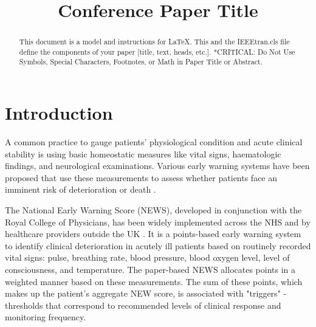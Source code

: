 \documentclass[10pt,journal, compsoc]{IEEEtran}
\begin{document}
\title{Conference Paper Title\\
}
\author{}

\maketitle

\begin{abstract}
    This document is a model and instructions for \LaTeX.
    This and the IEEEtran.cls file define the components of your paper [title, text, heads, etc.]. *CRITICAL: Do Not Use Symbols, Special Characters, Footnotes,
    or Math in Paper Title or Abstract.
\end{abstract}

\section{Introduction}
A common practice to gauge patients' physiological condition and acute clinical stability is using basic homeostatic measures like vital signs, haematologic findings, and neurological examinations. Various early warning systems have been proposed that use these measurements to assess whether patients face an imminent risk of deterioration or death \cite{Smith13}.

The National Early Warning Score (NEWS), developed in conjunction with the Royal College of Physicians, has been widely implemented across the NHS and by healthcare providers outside the UK \cite[pp.~13]{RCP17}. It is a points-based early warning system to identify clinical deterioration in acutely ill patients based on routinely recorded vital signs: pulse, breathing rate, blood pressure, blood oxygen level, level of consciousness, and temperature. The paper-based NEWS allocates points in a weighted manner based on these measurements. The sum of these points, which makes up the patient's aggregate NEW score, is associated with "triggers" - thresholds that correspond to recommended levels of clinical response and monitoring frequency.
\end{document}
